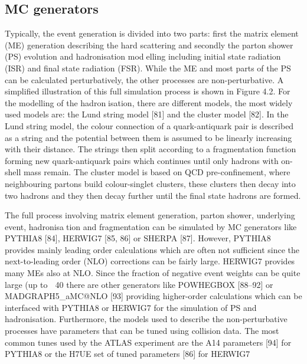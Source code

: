 \subsection{MC generators}

Typically, the event generation is divided into two parts: first the matrix element (ME) generation
describing the hard scattering and secondly the parton shower (PS) evolution and hadronisation modelling including initial state radiation (ISR) and final state radiation (FSR). While the ME and most
parts of the PS can be calculated perturbatively, the other processes are non-perturbative. A simplified
illustration of this full simulation process is shown in Figure 4.2. For the modelling of the hadronisation, there are different models, the most widely used models are: the Lund string model [81] and
the cluster model [82]. In the Lund string model, the colour connection of a quark-antiquark pair is
described as a string and the potential between them is assumed to be linearly increasing with their
distance. The strings then split according to a fragmentation function forming new quark-antiquark
pairs which continues until only hadrons with on-shell mass remain. The cluster model is based on
QCD pre-confinement, where neighbouring partons build colour-singlet clusters, these clusters then
decay into two hadrons and they then decay further until the final state hadrons are formed.

The full process involving matrix element generation, parton shower, underlying event, hadronisation and fragmentation can be simulated by MC generators like PYTHIA8 [84], HERWIG7 [85, 86]
or SHERPA [87]. However, PYTHIA8 provides mainly leading order calculations which are often not
sufficient since the next-to-leading order (NLO) corrections can be fairly large. HERWIG7 provides
many MEs also at NLO. Since the fraction of negative event weights can be quite large (up to
∼ 40%
there are other generators like POWHEGBOX [88–92] or MADGRAPH5_aMC@NLO [93] providing
higher-order calculations which can be interfaced with PYTHIA8 or HERWIG7 for the simulation of
PS and hadronisation.
Furthermore, the models used to describe the non-perturbative processes have parameters that can
be tuned using collision data. The most common tunes used by the ATLAS experiment are the A14
parameters [94] for PYTHIA8 or the H7UE set of tuned parameters [86] for HERWIG7

